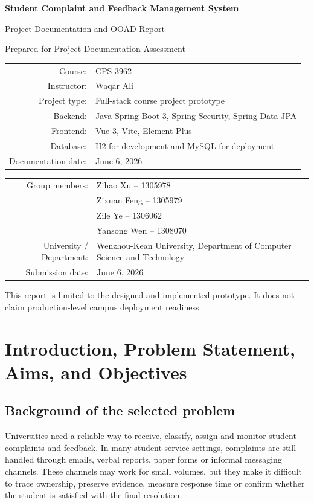 \documentclass[11pt,a4paper]{article}
\begin{document}
\begin{titlepage}
\centering
\vspace*{1.0cm}
{\Large\bfseries Student Complaint and Feedback Management System\par}
\vspace{0.4cm}
{\large Project Documentation and OOAD Report\par}
\vspace{0.6cm}
{\normalsize Prepared for Project Documentation Assessment\par}
\vspace{0.9cm}
\begin{tabular}{rl}
Course: & CPS 3962\\
Instructor: & Waqar Ali\\
Project type: & Full-stack course project prototype\\
Backend: & Java Spring Boot 3, Spring Security, Spring Data JPA\\
Frontend: & Vue 3, Vite, Element Plus\\
Database: & H2 for development and MySQL for deployment\\
Documentation date: & June 6, 2026\\
\end{tabular}
\vspace{0.8cm}

\begin{tabular}{rl}
Group members: & Zihao Xu -- 1305978\\
& Zixuan Feng -- 1305979\\
& Zile Ye -- 1306062\\
& Yansong Wen -- 1308070\\
University / Department: & Wenzhou-Kean University, Department of Computer Science and Technology\\
Submission date: & June 6, 2026\\
\end{tabular}
\vfill
{\small This report is limited to the designed and implemented prototype. It does not claim production-level campus deployment readiness.}
\end{titlepage}

\section{Introduction, Problem Statement, Aims, and Objectives}

\subsection{Background of the selected problem}
Universities need a reliable way to receive, classify, assign and monitor student complaints and feedback. In many student-service settings, complaints are still handled through emails, verbal reports, paper forms or informal messaging channels. These channels may work for small volumes, but they make it difficult to trace ownership, preserve evidence, measure response time or confirm whether the student is satisfied with the final resolution.
\end{document}
